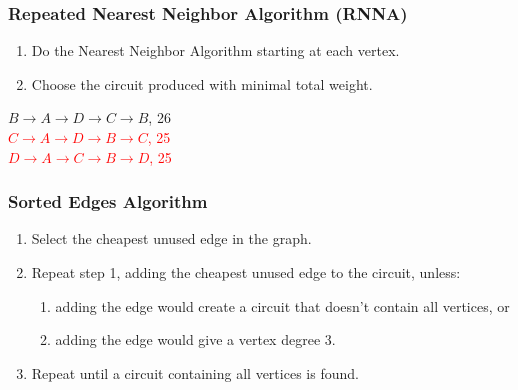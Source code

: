 \documentclass{beamer}
\theoremstyle{definition}
\begin{document}
\begin{frame}
\frametitle{Repeated Nearest Neighbor Algorithm (RNNA)}
\begin{enumerate}
\item	Do the Nearest Neighbor Algorithm starting at each vertex.
\item	Choose the circuit produced with minimal total weight.
\end{enumerate}
\begin{center}
$B\rightarrow A \rightarrow D \rightarrow C \rightarrow B$, 26\\
\textcolor{red}{$C\rightarrow A \rightarrow D \rightarrow B \rightarrow C$, 25}\\
\textcolor{red}{$D\rightarrow A \rightarrow C \rightarrow B \rightarrow D$, 25}
\end{center}
\end{frame}

\begin{frame}
\frametitle{Sorted Edges Algorithm}
\begin{enumerate}
\item Select the cheapest unused edge in the graph.
\item Repeat step 1, adding the cheapest unused edge to the circuit, unless:
\begin{enumerate}
\item adding the edge would create a circuit that doesn't contain all vertices, or
\item adding the edge would give a vertex degree 3.
\end{enumerate}
\item Repeat until a circuit containing all vertices is found.
\end{enumerate}
\pause
\begin{center}
\end{center}
\end{frame}
\end{document}
